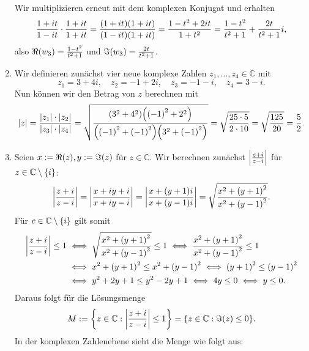 \documentclass[german,12pt]{homework}
\newcommand{\CC}{\mathbb{C}}
\DeclarePairedDelimiter{\absolute}{\lvert}{\rvert}
\DeclarePairedDelimiter{\enbrace}{(}{)}
\DeclarePairedDelimiter{\penbrace}{\{}{\}}
\begin{document}
\begin{enumerate}
        Wir multiplizieren erneut mit dem komplexen Konjugat und erhalten
        \[\frac{1 + it}{1 - it} \cdot \frac{1 + it}{1 + it} = \frac{\enbrace*{1 + it}\enbrace*{1 + it}}{\enbrace*{1 - it}\enbrace*{1 + it}} = \frac{1 - t^2 + 2it}{1 + t^2} = \frac{1 - t^2}{t^2 + 1} + \frac{2t}{t^2 + 1}i,\]
        also \(\Re\enbrace*{w_3} = \frac{1 - t^2}{t^2 + 1}\) und \(\Im\enbrace*{w_3} = \frac{2t}{t^2 + 1}\).
        \item Wir definieren zunächst vier neue komplexe Zahlen \(z_1, \ldots, z_4 \in \mathbb{C}\) mit
        \[z_1 = 3 + 4i, \quad z_2 = -1 + 2i, \quad z_3 = -1 - i, \quad z_4 = 3 - i.\]
        Nun können wir den Betrag von \(z\) berechnen mit
        \[\absolute*{z} = \frac{\absolute*{z_1} \cdot \absolute*{z_2}}{\absolute*{z_3} \cdot \absolute*{z_4}} = \sqrt{\frac{\enbrace*{3^2 + 4^2}\enbrace*{\enbrace*{-1}^2 + 2^2}}{\enbrace*{\enbrace*{-1}^2 + \enbrace*{-1}^2}\enbrace*{3^2 + \enbrace*{-1}^2}}} = \sqrt{\frac{25 \cdot 5}{2 \cdot 10}} = \sqrt{\frac{125}{20}} = \frac{5}{2}.\]
        \item Seien \(x := \Re\enbrace*{z}, y := \Im\enbrace*{z}\) für \(z \in \CC\). Wir berechnen zunächst \(\absolute*{\frac{z + i}{z - i}}\) für \(z \in \CC \setminus \penbrace*{i}\):
        \[\absolute*{\frac{z + i}{z - i}} = \absolute*{\frac{x + iy + i}{x + iy - i}} = \absolute*{\frac{x + \enbrace*{y + 1}i}{x + \enbrace*{y - 1}i}} = \sqrt{\frac{x^2 + \enbrace*{y + 1}^2}{x^2 + \enbrace*{y - 1}^2}}.\]
        Für \(c \in \CC \setminus \penbrace*{i}\) gilt somit
        \begin{align*}
            \absolute*{\frac{z + i}{z - i}} \le 1 &\iff \sqrt{\frac{x^2 + \enbrace*{y + 1}^2}{x^2 + \enbrace*{y - 1}^2}} \le 1 \iff \frac{x^2 + \enbrace*{y + 1}^2}{x^2 + \enbrace*{y - 1}^2} \le 1\\
            &\iff x^2 + \enbrace*{y + 1}^2 \le x^2 + \enbrace*{y - 1}^2 \iff \enbrace*{y + 1}^2 \le \enbrace*{y - 1}^2\\
            &\iff y^2 + 2y + 1 \le y^2 - 2y + 1 \iff 4y \le 0 \iff y \le 0.
        \end{align*}
        Daraus folgt für die Lösungsmenge
        \[M := \penbrace*{z \in \CC : \absolute*{\frac{z + i}{z - i}} \le 1} = \penbrace*{z \in \CC : \Im\enbrace*{z} \le 0}.\]
        In der komplexen Zahlenebene sieht die Menge wie folgt aus:
        \begin{center}
\end{center}
\end{enumerate}
\end{document}
